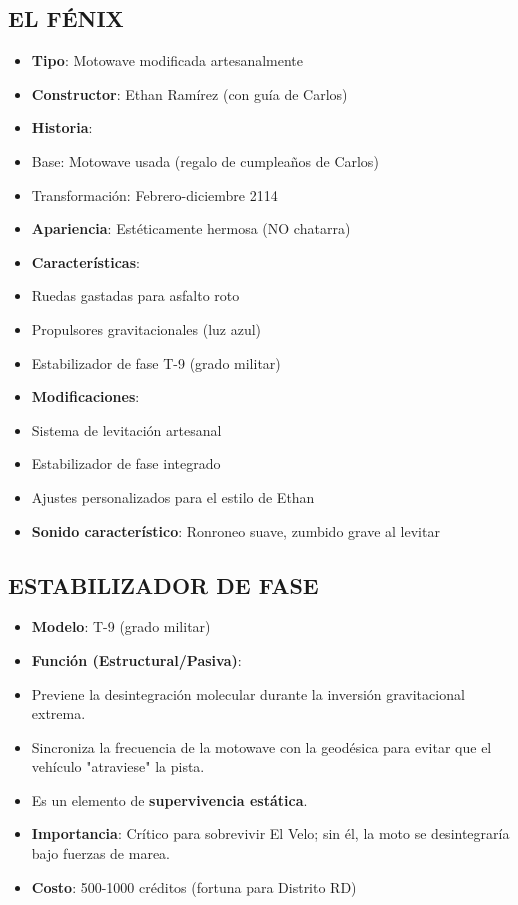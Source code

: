 \documentclass[11pt,a4paper]{report}
\begin{document}
\subsection{EL FÉNIX}
\begin{itemize}
  \item \textbf{Tipo}: Motowave modificada artesanalmente
  \item \textbf{Constructor}: Ethan Ramírez (con guía de Carlos)
  \item \textbf{Historia}: 
  \item Base: Motowave usada (regalo de cumpleaños de Carlos)
  \item Transformación: Febrero-diciembre 2114
  \item \textbf{Apariencia}: Estéticamente hermosa (NO chatarra)
  \item \textbf{Características}:
  \item Ruedas gastadas para asfalto roto
  \item Propulsores gravitacionales (luz azul)
  \item Estabilizador de fase T-9 (grado militar)
  \item \textbf{Modificaciones}:
  \item Sistema de levitación artesanal
  \item Estabilizador de fase integrado
  \item Ajustes personalizados para el estilo de Ethan
  \item \textbf{Sonido característico}: Ronroneo suave, zumbido grave al levitar

\end{itemize}
\subsection{ESTABILIZADOR DE FASE}
\begin{itemize}
  \item \textbf{Modelo}: T-9 (grado militar)
  \item \textbf{Función (Estructural/Pasiva)}: 
  \item Previene la desintegración molecular durante la inversión gravitacional extrema.
  \item Sincroniza la frecuencia de la motowave con la geodésica para evitar que el vehículo "atraviese" la pista.
  \item Es un elemento de \textbf{supervivencia estática}.
  \item \textbf{Importancia}: Crítico para sobrevivir El Velo; sin él, la moto se desintegraría bajo fuerzas de marea.
  \item \textbf{Costo}: 500-1000 créditos (fortuna para Distrito RD)

\end{itemize}
\end{document}
